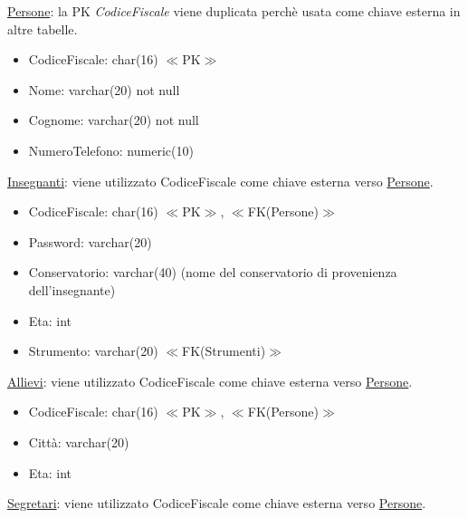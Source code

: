 \documentclass{article}
\begin{document}
\begin{flushleft}
\underline{Persone}: la PK \emph{CodiceFiscale} viene duplicata perchè usata come chiave esterna in altre tabelle.
\end{flushleft}

\begin{itemize}
\item CodiceFiscale: char(16) $\ll$PK$\gg$
\item Nome: varchar(20) not null
\item Cognome: varchar(20) not null
\item NumeroTelefono: numeric(10)
\end{itemize}

\medskip

\begin{flushleft}
\underline{Insegnanti}: viene utilizzato CodiceFiscale come chiave esterna verso \underline{Persone}.
\end{flushleft}

\begin{itemize}
\item CodiceFiscale: char(16) $\ll$PK$\gg$, $\ll$FK(Persone)$\gg$
\item Password: varchar(20)
\item Conservatorio: varchar(40) (nome del conservatorio di provenienza dell'insegnante)
\item Eta: int
\item Strumento: varchar(20) $\ll$FK(Strumenti)$\gg$
\end{itemize}

\medskip

\begin{flushleft}
\underline{Allievi}: viene utilizzato CodiceFiscale come chiave esterna verso \underline{Persone}.
\end{flushleft}

\begin{itemize}
\item CodiceFiscale: char(16) $\ll$PK$\gg$, $\ll$FK(Persone)$\gg$
\item Città: varchar(20)
\item Eta: int
\end{itemize}

\medskip

\begin{flushleft}
\underline{Segretari}: viene utilizzato CodiceFiscale come chiave esterna verso \underline{Persone}.
\end{flushleft}
\end{document}
